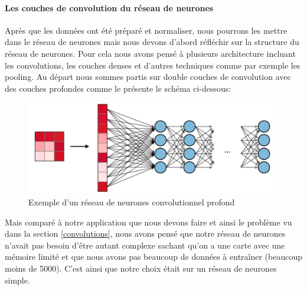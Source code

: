 \documentclass[a4paper,11pt]{article}
\begin{document}
\paragraph{Les couches de convolution du réseau de neurones}
Après que les données ont été préparé et normaliser, nous pourrons les mettre dans le réseau de neurones mais nous devons d'abord réfléchir sur la structure du réseau de neurones. Pour cela nous avons pensé à plusieurs architecture incluant les convolutions, les couches denses et d'autres techniques comme par exemple les pooling. Au départ nous sommes partis sur double couches de convolution avec des couches profondes comme le présente le schéma ci-dessous: 
\begin{figure}[H]
\begin{center}
\includegraphics[scale=0.3]{images/cnn1.png}
\caption{Exemple d'un réseau de neurones convolutionnel profond}
\end{center}
\end{figure}
Mais comparé à notre application que nous devons faire et ainsi le problème vu dans la section \ref{convolutions}, nous avons pensé que notre réseau de neurones n'avait pas besoin d'être autant complexe sachant qu'on a une carte avec une mémoire limité et que nous avons pas beaucoup de données à entraîner (beaucoup moins de 5000). C'est ainsi que notre choix était sur un réseau de neurones simple.
\end{document}

